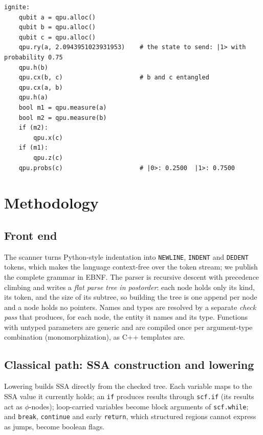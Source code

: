 \documentclass[11pt]{article}
\begin{document}
\begin{lstlisting}[language=Nova, caption={Quantum teleportation in Nova: qubits, gates from the built-in
\texttt{qpu} module, and classical feedback through \texttt{if}.}, label=lst:teleport]
ignite:
    qubit a = qpu.alloc()
    qubit b = qpu.alloc()
    qubit c = qpu.alloc()
    qpu.ry(a, 2.0943951023931953)    # the state to send: |1> with probability 0.75
    qpu.h(b)
    qpu.cx(b, c)                     # b and c entangled
    qpu.cx(a, b)
    qpu.h(a)
    bool m1 = qpu.measure(a)
    bool m2 = qpu.measure(b)
    if (m2):
        qpu.x(c)
    if (m1):
        qpu.z(c)
    qpu.probs(c)                     # |0>: 0.2500  |1>: 0.7500
\end{lstlisting}

\section{Methodology}
\label{sec:method-design}

\subsection{Front end}
\label{sec:frontend}

The scanner turns Python-style indentation into \texttt{NEWLINE}, \texttt{INDENT} and \texttt{DEDENT} tokens, which
makes the language context-free over the token stream; we publish the complete grammar in EBNF. The parser is
recursive descent with precedence climbing and writes a \emph{flat parse tree in postorder}: each node holds only its
kind, its token, and the size of its subtree, so building the tree is one append per node and a node holds no
pointers. Names and types are resolved by a separate \emph{check pass} that produces, for each node, the entity it
names and its type. Functions with untyped parameters are generic and are compiled once per argument-type
combination (monomorphization), as C++ templates are.

\subsection{Classical path: SSA construction and lowering}
\label{sec:classical}

Lowering builds SSA directly from the checked tree. Each variable maps to the SSA value it currently holds; an
\texttt{if} produces results through \texttt{scf.if} (its results act as $\phi$-nodes); loop-carried variables become
block arguments of \texttt{scf.while}; and \texttt{break}, \texttt{continue} and early \texttt{return}, which
structured regions cannot express as jumps, become boolean flags.
\end{document}
